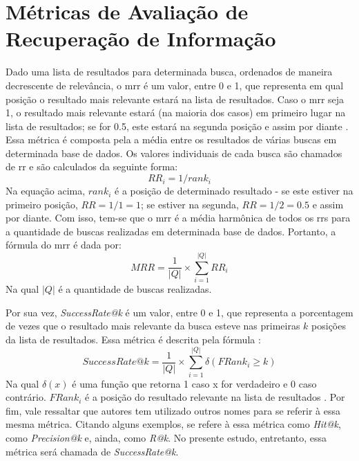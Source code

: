 \section{Métricas de Avaliação de Recuperação de Informação}
Dado uma lista de resultados para determinada busca, ordenados de maneira decrescente de relevância, o \gls{mrr} é um valor, entre 0 e 1, que representa em qual posição o resultado mais relevante estará na lista de resultados. Caso o \gls{mrr} seja 1, o resultado mais relevante estará (na maioria dos casos) em primeiro lugar na lista de resultados; se for 0.5, este estará na segunda posição e assim por diante \cite{Craswell2009}. Essa métrica é composta pela a média entre os resultados de várias buscas em determinada base de dados. Os valores individuais de cada busca são chamados de \gls{rr} e são calculados da seguinte forma:
\begin{equation*}
    RR_i=1/rank_i
\end{equation*}
Na equação acima, $rank_i$ é a posição de determinado resultado - se este estiver na primeiro posição, $RR=1/1=1$; se estiver na segunda, $RR=1/2=0.5$ e assim por diante. Com isso, tem-se que o \gls{mrr} é a média harmônica de todos os \glspl{rr} para a quantidade de buscas realizadas em determinada base de dados. Portanto, a fórmula do \gls{mrr} é dada por:
\begin{equation*}
    MRR = \frac{1}{|Q|} \times \sum_{i=1}^{|Q|} RR_i
\end{equation*}
Na qual $|Q|$ é a quantidade de buscas realizadas.

Por sua vez, \textit{SuccessRate@k} é um valor, entre 0 e 1, que representa a porcentagem de vezes que o resultado mais relevante da busca esteve nas primeiras $k$ posições da lista de resultados. Essa métrica é descrita pela fórmula \cite{Wan2019MultimodalAN}:
\begin{equation*}
    SuccessRate@k=\frac{1}{|Q|} \times \sum_{i=1}^{|Q|} \delta(FRank_i \geq k)
\end{equation*}
Na qual $\delta(x)$ é uma função que retorna 1 caso x for verdadeiro e 0 caso contrário. $FRank_i$ é a posição do resultado relevante na lista de resultados \cite{Raghothaman2016SWIMSW}. Por fim, vale ressaltar que autores tem utilizado outros nomes para se referir à essa mesma métrica. Citando alguns exemplos, \textcite{Ling2020AdaptiveDC} se refere à essa métrica como \textit{Hit@k}, \textcite{Bui2021SelfSupervisedCL} como \textit{Precision@k} e, ainda, \textcite{Gu2021CRaDLeDC} como \textit{R@k}. No presente estudo, entretanto, essa métrica será chamada de \textit{SuccessRate@k}.

